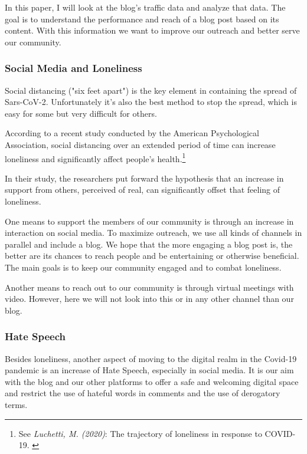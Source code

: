 In this paper, I will look at the blog's traffic data and analyze that data. The goal is to understand the performance and reach of a blog post based on its content. With this information we want to improve our outreach and better serve our community.

\subsubsection{Social Media and Loneliness}

Social distancing ("six feet apart") is the key element in containing the spread of Sars-CoV-2. Unfortunately it's also the best method to stop the spread, which is easy for some but very difficult for others.

According to a recent study conducted by the American Psychological Association, social distancing over an extended period of time can increase loneliness and significantly affect people's health.\footnote{See \textit{Luchetti, M. (2020)}: The trajectory of loneliness in response to COVID-19. \cite{apaLoneliness}}

In their study, the researchers put forward the hypothesis that an increase in support from others, perceived of real, can significantly offset that feeling of loneliness.

One means to support the members of our community is through an increase in interaction on social media. To maximize outreach, we use all kinds of channels in parallel and include a blog. We hope that the more engaging a blog post is, the better are its chances to reach people and be entertaining or otherwise beneficial. The main goals is to keep our community engaged and to combat loneliness.

Another means to reach out to our community is through virtual meetings with video. However, here we will not look into this or in any other channel than our blog.

\subsubsection{Hate Speech}

Besides loneliness, another aspect of moving to the digital realm in the Covid-19 pandemic is an increase of Hate Speech, especially in social media. It is our aim with the blog and our other platforms to offer a safe and welcoming digital space and restrict the use of hateful words in comments and the use of derogatory terms.


